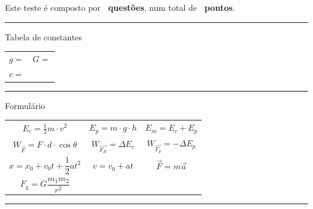 \vspace{2cm}
Este teste é composto por \textbf{\numquestions\ questões}, num total de \textbf{\numpoints\ pontos}.

\par\noindent\rule{\textwidth}{0.4pt}

\vspace{10pt}
{\Large Tabela de constantes}

\begin{center}
	\begin{tabular}{c|c}
		
		$g = $ \kAccelGravity & $ G = $ \kGravity \\
		 $c = $ \kSpeedLight & \\
		
	\end{tabular}
\end{center}

\par\noindent\rule{\textwidth}{0.4pt}

\vspace{10pt}
{\Large Formulário}

\begin{center}
	\begin{tabular}{ccc}
		
		$E_c = \frac{1}{2} m \cdot v^2$ & $ E_p = m \cdot g \cdot h $ & $E_m = E_c + E_p$\\
		$W_{\vec{F}} = F \cdot d \cdot \cos \theta$ & $W_{\vec{F_R}} = \Delta E_c$ & $W_{\vec{F_g}} = - \Delta E_p$\\
		$x = x_0 + v_0 t + \dfrac{1}{2} a t^2$ & $v = v_0 + a t$ & $\vec{F} = m \vec{a}$\\
		$F_{\text{g}} = G \dfrac{m_1 m_2}{r^2}$ & &\\
		
	\end{tabular}
\end{center}

\par\noindent\rule{\textwidth}{0.4pt}